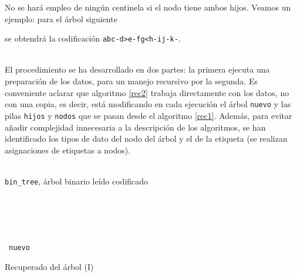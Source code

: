 \documentclass[a4paper,10pt]{scrartcl}
\begin{document}
 No se hará empleo de ningún centinela si el nodo tiene ambos hijos. Veamos un ejemplo: para el árbol siguiente
 
 
 se obtendrá la codificación \texttt{abc-d>e-fg<h-ij-k-}.\\\ %
 
 
 El procedimiento se ha desarrollado en dos partes: la primera ejecuta una
 preparación de los datos, para un manejo recursivo por la segunda. Es conveniente
 aclarar que algoritmo \ref{rec2} trabaja directamente con los
 datos, no con una copia, es decir, está modificando en cada ejecución
 el árbol \texttt{nuevo} y las pilas \texttt{hijos} y \texttt{nodos} que se pasan 
 desde el algoritmo \ref{rec1}. Además, para evitar añadir complejidad
 innecesaria a la descripción de los algoritmos, se han identificado los
 tipos de dato del nodo del árbol y el de la etiqueta (se realizan asignaciones
 de etiquetas a nodos).
  
   
      \begin{algorithm}[H]
      \begin{algorithmic}[1]
     \REQUIRE \ \\
         \texttt{bin\_tree}, árbol binario leído codificado\\\
     
     \\\
       \ELSE
         \ENDIF
       \ENDIF
     \ENDFOR
     \\\
     \\\
     \RETURN \texttt{nuevo}
      \end{algorithmic}
      \caption{Recuperado del árbol (I)}
      \label{rec1}
      \end{algorithm}
   
\end{document}
